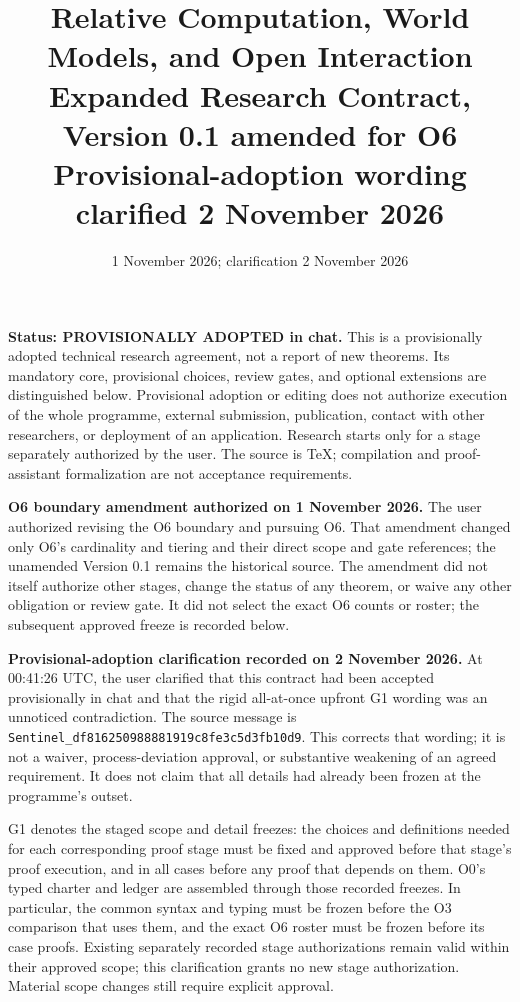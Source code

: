 \documentclass[11pt,a4paper]{article}
\title{Relative Computation, World Models, and Open Interaction\\[5pt]
\large Expanded Research Contract, Version 0.1 amended for O6\\
\normalsize Provisional-adoption wording clarified 2 November 2026}
\author{}
\date{1 November 2026; clarification 2 November 2026}
\begin{document}
\maketitle
\vspace{-1em}

\textbf{Status: PROVISIONALLY ADOPTED in chat.}
This is a provisionally adopted technical research agreement, not a report of
new theorems. Its mandatory core, provisional choices, review gates, and optional
extensions are distinguished below. Provisional adoption or editing does not
authorize execution of the whole programme, external submission, publication,
contact with other researchers, or deployment of an application. Research
starts only for a stage separately authorized by the user. The source is TeX;
compilation and proof-assistant formalization are not acceptance requirements.

\textbf{O6 boundary amendment authorized on 1 November 2026.}
The user authorized revising the O6 boundary and pursuing O6. That amendment
changed only O6's cardinality and tiering and their direct scope and
gate references; the unamended Version 0.1 remains the historical source.
The amendment did not itself authorize other stages, change the status of
any theorem, or waive any other obligation or review gate. It did not select
the exact O6 counts or roster; the subsequent approved freeze is recorded below.

\textbf{Provisional-adoption clarification recorded on 2 November 2026.}
At 00:41:26 UTC, the user clarified that this contract had been accepted
provisionally in chat and that the rigid all-at-once upfront G1 wording was
an unnoticed contradiction. The source message is
\texttt{Sentinel\_df816250988881919c8fe3c5d3fb10d9}.
This corrects that wording; it is not a waiver, process-deviation approval,
or substantive weakening of an agreed requirement. It does not claim that
all details had already been frozen at the programme's outset.

G1 denotes the staged scope and detail freezes: the choices and definitions
needed for each corresponding proof stage must be fixed and approved before
that stage's proof execution, and in all cases before any proof that depends
on them. O0's typed charter and ledger are assembled through those recorded
freezes. In particular, the common syntax and typing must be frozen before
the O3 comparison that uses them, and the exact O6 roster must be frozen
before its case proofs. Existing separately recorded stage authorizations
remain valid within their approved scope; this clarification grants no new
stage authorization. Material scope changes still require explicit approval.
\end{document}
